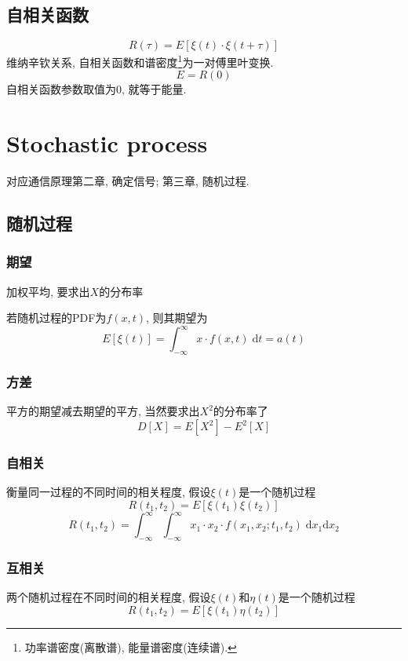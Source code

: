 \documentclass[a4paper]{report}
\begin{document}
\section{自相关函数}
\begin{equation}
  R(\tau)=E[\xi(t)\cdot \xi(t+\tau)]
\end{equation}
维纳辛钦关系, 自相关函数和谱密度\footnote{功率谱密度(离散谱), 能量谱密度(连续谱). }为一对傅里叶变换. 
\begin{equation}
  E=R(0)
\end{equation}
自相关函数参数取值为0, 就等于能量. 




\chapter{Stochastic process}
对应通信原理第二章, 确定信号; 第三章, 随机过程. 
\section{随机过程}
\subsection{期望}
加权平均, 要求出$X$的分布率

若随机过程的PDF为$f(x,t)$, 则其期望为
\begin{equation}
  E[\xi(t)]=\int_{-\infty}^\infty x\cdot f(x,t)\;\text{d}t=a(t)
\end{equation}
\subsection{方差}
平方的期望减去期望的平方, 当然要求出$X^2$的分布率了
\begin{equation}
  D[X]=E[X^2]-E^2[X]
\end{equation}
\subsection{自相关}
衡量同一过程的不同时间的相关程度, 假设$\xi(t)$是一个随机过程
\begin{equation}
  R(t_1,t_2)=E[\xi(t_1)\xi(t_2)]
\end{equation}
\begin{equation}
  R(t_1,t_2)=\int_{-\infty}^\infty \int_{-\infty}^\infty x_1\cdot x_2\cdot f(x_1,x_2;t_1,t_2)\;\text{d}x_1 \text{d}x_2
\end{equation}
\subsection{互相关}
两个随机过程在不同时间的相关程度, 假设$\xi(t)$和$\eta(t)$是一个随机过程
\begin{equation}
  R(t_1,t_2)=E[\xi(t_1)\eta(t_2)]
\end{equation}
\end{document}
